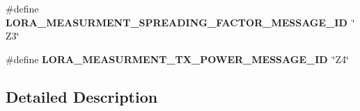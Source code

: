 \begin{DoxyCompactItemize}
\item 
\hypertarget{group___lo_ra_gab657b781d45448ad40b1c353954ad2b2}{}\#define {\bfseries L\+O\+R\+A\+\_\+\+M\+E\+A\+S\+U\+R\+M\+E\+N\+T\+\_\+\+S\+P\+R\+E\+A\+D\+I\+N\+G\+\_\+\+F\+A\+C\+T\+O\+R\+\_\+\+M\+E\+S\+S\+A\+G\+E\+\_\+\+I\+D}~\char`\"{}Z3\char`\"{}\label{group___lo_ra_gab657b781d45448ad40b1c353954ad2b2}

\item 
\hypertarget{group___lo_ra_ga0464384c46d80e3b2fb49402f601a604}{}\#define {\bfseries L\+O\+R\+A\+\_\+\+M\+E\+A\+S\+U\+R\+M\+E\+N\+T\+\_\+\+T\+X\+\_\+\+P\+O\+W\+E\+R\+\_\+\+M\+E\+S\+S\+A\+G\+E\+\_\+\+I\+D}~\char`\"{}Z4\char`\"{}\label{group___lo_ra_ga0464384c46d80e3b2fb49402f601a604}

\end{DoxyCompactItemize}


\subsection{Detailed Description}
